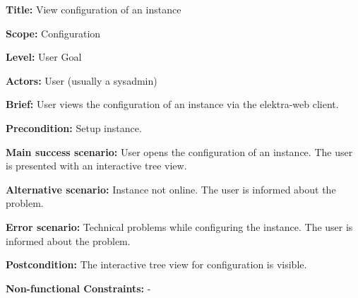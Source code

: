 
\begin{DoxyItemize}
\item {\bfseries{Title\+:}} View configuration of an instance
\item {\bfseries{Scope\+:}} Configuration
\item {\bfseries{Level\+:}} User Goal
\item {\bfseries{Actors\+:}} User (usually a sysadmin)
\item {\bfseries{Brief\+:}} User views the configuration of an instance via the elektra-\/web client.
\end{DoxyItemize}


\begin{DoxyItemize}
\item {\bfseries{Precondition\+:}} Setup instance.
\item {\bfseries{Main success scenario\+:}} User opens the configuration of an instance. The user is presented with an interactive tree view.
\item {\bfseries{Alternative scenario\+:}} Instance not online. The user is informed about the problem.
\item {\bfseries{Error scenario\+:}} Technical problems while configuring the instance. The user is informed about the problem.
\item {\bfseries{Postcondition\+:}} The interactive tree view for configuration is visible.
\item {\bfseries{Non-\/functional Constraints\+:}} -\/ 
\end{DoxyItemize}